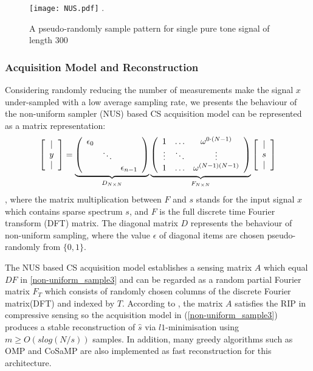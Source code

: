 \begin{figure}[!t]
\centering
\texttt{[image: NUS.pdf]}
\DeclareGraphicsExtensions.
\caption{A pseudo-randomly sample pattern for single pure tone signal of length 300}\label{NUS}
\end{figure}

\subsubsection{Acquisition Model and Reconstruction}

Considering randomly reducing the number of measurements make the signal $x$ under-sampled with a low average sampling rate, we presents the behaviour of the non-uniform sampler (NUS)\cite{candes2008introduction} based CS acquisition model can be represented as a matrix representation:
\begin{align}
\label{non-uniform_sample3}
\left[
\begin{array}[c]{c}
| \\
y  \\
|
\end{array}
\right] =
\underbrace{\left(
\begin{array}[c]{ccc}
\epsilon_0 && \\
&\ddots &  \\
&&\epsilon_{n-1}
\end{array}\right)}_{D_{N \times N}}
\underbrace{\left(
\begin{array}[c]{ccc}
1 & \ldots & \omega^{0 \cdot (N-1)} \\
\vdots & \ddots & \vdots  \\   
1 & \ldots & \omega^{(N-1)(N-1)}
\end{array}\right)}_{F_{N \times N}}
\left[
\begin{array}[c]{c}
| \\
s  \\
|
\end{array}
\right]
\end{align}
, where the matrix multiplication between $F$ and $s$ stands for the input signal $x$ which contains sparse spectrum $s$, and $F$ is the full discrete time Fourier transform (DFT) matrix. The diagonal matrix $D$ represents the behaviour of non-uniform sampling, where the value $\epsilon$ of diagonal items are chosen pseudo-randomly from $\{0,1\}$.

The NUS based CS acquisition model establishes a sensing matrix $A$ which equal $DF$ in \ref{non-uniform_sample3} and can be regarded as a random partial Fourier matrix $F_{T}$ which consists of randomly chosen columns of the discrete Fourier matrix(DFT) and indexed by $T$. According to \cite{ragheb2007implementation}, the matrix $A$ satisfies the RIP in compressive sensing so the acquisition model in (\ref{non-uniform_sample3}) produces a stable reconstruction of $\hat s$ via $l1$-minimisation using $m \geq O(slog(N/s))$ samples\cite{ragheb2007implementation}. In addition, many greedy algorithms such as OMP and CoSaMP are also implemented as fast reconstruction for this architecture\cite{maechler2011random}.

